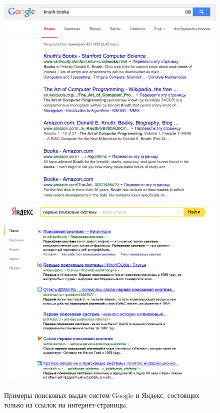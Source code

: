\documentclass[12pt,a4paper]{report}
\begin{document}
\begin{figure}[b!]
  \centering
  \includegraphics[height=0.3\textheight]{pics/OrganicSerachResults-Google.png}
  \includegraphics[height=0.3\textheight]{pics/OrganicSerachResults-Yandex.png}
  \caption{Примеры поисковых выдач систем Google и Яндекс, состоящих только из ссылок на интернет-страницы.}
  \label{organic-serp}
\end{figure}
\end{document}

